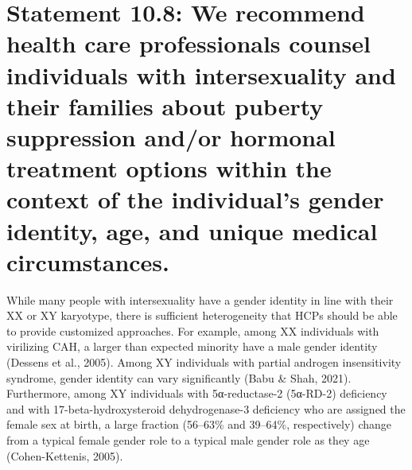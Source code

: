 \documentclass[
]{book}
\begin{document}
\hypertarget{statement-10.8-we-recommend-health-care-professionals-counsel-individuals-with-intersexuality-and-their-families-about-puberty-suppression-andor-hormonal-treatment-options-within-the-context-of-the-individuals-gender-identity-age-and-unique-medical-circumstances.}{%
\section*{Statement 10.8: We recommend health care professionals counsel individuals with intersexuality and their families about puberty suppression and/or hormonal treatment options within the context of the individual's gender identity, age, and unique medical circumstances.}\label{statement-10.8-we-recommend-health-care-professionals-counsel-individuals-with-intersexuality-and-their-families-about-puberty-suppression-andor-hormonal-treatment-options-within-the-context-of-the-individuals-gender-identity-age-and-unique-medical-circumstances.}}

While many people with intersexuality have a
gender identity in line with their XX or XY karyotype, there is sufficient heterogeneity that HCPs
should be able to provide customized approaches.
For example, among XX individuals with virilizing
CAH, a larger than expected minority have a male
gender identity (Dessens et al., 2005). Among XY
individuals with partial androgen insensitivity syndrome, gender identity can vary significantly (Babu
\& Shah, 2021). Furthermore, among XY individuals
with 5α-reductase-2 (5α-RD-2) deficiency and with
17-beta-hydroxysteroid dehydrogenase-3 deficiency
who are assigned the female sex at birth, a large
fraction (56--63\% and 39--64\%, respectively) change
from a typical female gender role to a typical male
gender role as they age (Cohen-Kettenis, 2005).
\end{document}
